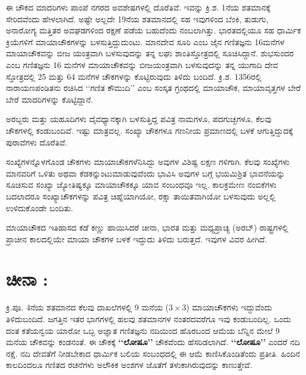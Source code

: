 ಈ ಚೌಕದ ಮಾದರಿಗಳು ಪಾಂಪೆ ನಗರದ ಅವಶೇಷಗಳಲ್ಲಿ ದೊರೆತಿವೆ. ಇವನ್ನು ಕ್ರಿ.ಶ. 1ನೆಯ ಶತಮಾನಕ್ಕೆ ಸೇರಿದವೆಂದು ಹೇಳಲಾಗಿದೆ. ಅಷ್ಟೇ ಅಲ್ಲದೇ 19ನೆಯ ಶತಮಾನದಲ್ಲಿ ಸಹ ಇವುಗಳಿಂದ ಬೆಂಕಿ, ತುಡುಗು, ಅನಾರೋಗ್ಯ ಮತ್ತಿತರ ಅವಘಡಗಳಿಂದ ರಕ್ಷಣೆ ಪಡೆಯ ಬಹುದೆಂದು ನಂಬಲಾಗಿತ್ತು. ಭಾರತದಲ್ಲಿಯೂ ಸಹ ಧಾರ್ಮಿಕ ಕ್ರಿಯೆಗಳಿಗೆ ಮಾಯಾ\-ಚೌಕಗಳನ್ನು ಬಳಸುತ್ತಿದ್ದುದುಂಟು. ಮಾನದೇವ ಸೂರಿ ಎಂಬ ಜೈನ ಗಣಿತಜ್ಞನು 16ಮನೆಗಳ ಮಾಯಾ\-ಚೌಕವನ್ನು ಬೀಜ ಯಂತ್ರವಾಗಿ ಬಳಸುವುದನ್ನು ತನ್ನ ಲಘು ಶಾಂತಿಸ್ತೋತ್ರದಲ್ಲಿ ಸೂಚಿಸಿ\-ದ್ದಾನೆ. ಶುಭಸುಂದರ ಎಂಬ ಗಣಿತಜ್ಞನು 16 ಮನೆಗಳ ಮಾಯಾಚೌಕವನ್ನು ಬೀಜಯಂತ್ರವಾಗಿ ಬಳಸುವುದನ್ನು ತನ್ನ ಯುಗಾದಿ ದೇವ ಸ್ತೋತ್ರದಲ್ಲಿ 25 ಮತ್ತು 64 ಮನೆಗಳ ಚೌಕಗಳನ್ನು ಕೊಟ್ಟಿರುವುದು ತಿಳಿದು ಬಂದಿದೆ. ಕ್ರಿ.ಶ. 1356ರಲ್ಲಿ ನಾರಾಯಣಪಂಡಿತನು ರಚಿಸಿದ ‘‘ಗಣಿತ ಕೌಮುದಿ’’ ಎಂಬ ಸಂಸ್ಕತ ಗ್ರಂಥದಲ್ಲಿ ಮಾಯಾಚೌಕ, ಮಾಯಾವೃತ್ತಗಳ ಬೇರೆ ಬೇರೆ ಮಾದರಿಗಳನ್ನು ಕೊಟ್ಟಿದ್ದಾನೆ.

ಅರಬ್ಬರು ಮತ್ತು ಯಹೂದಿಗಳು ದೈವಧ್ಯಾನಕ್ಕಾಗಿ ಬಳಸುತ್ತಿದ್ದ ಪವಿತ್ರ ನಾಮಗಳೂ, ಪದಗುಚ್ಛಗಳೂ, ಕೆಲವು ಚೌಕಗಳಲ್ಲಿ ಕಂಡುಬಂದಿವೆ. ಇಷ್ಟು ಮಾತ್ರವಲ್ಲ. ಸಂಖ್ಯಾ ಚೌಕಗಳೂ ಗಣನೀಯ ಪ್ರಮಾಣದಲ್ಲಿ ಬಳಕೆ ಆಗುತ್ತಿದ್ದುದಕ್ಕೆ ಪುರಾವೆಗಳು ದೊರೆತಿವೆ.

ಸಂಖ್ಯೆಗಳನ್ನೊಳಗೊಂಡ ಚೌಕಗಳು ಮಾಯಾಚೌಕಗಳೆನಿಸಿದ್ದು ಅವುಗಳ ವಿಶಿಷ್ಟ ಲಕ್ಷಣ ಗಳಿಗಾಗಿ. ಕೆಲವು ಸಂಖ್ಯೆಗಳು ಮಾನವರಿಗೆ ಒಳಿತು ಅಥವಾ ಕೆಡಕನ್ನುಂಟುಮಾಡುವುವೆಂದು ಭಾವಿಸಿ ಅವುಗಳ ಬಗ್ಗೆ ಭಯಮಿಶ್ರಿತ ಭಾವನೆಯನ್ನು ಸೂಚಿಸುವ ಸಂಖ್ಯಾ ಜ್ಯೋತಿಷ್ಯಕ್ಕೂ ಮಾಯಾಚೌಕಕ್ಕೂ ಯಾವ ಸಂಬಂಧವೂ ಇಲ್ಲ. ಕಾಲಕ್ರಮೇಣ ನಂಬಿಕೆಗಳು ಬದಲಾದರೂ ಸಂಖ್ಯಾ\-ಚೌಕಗಳನ್ನು ಪವಿತ್ರ ಚಿಹ್ನೆಯಾಗಿಯೋ, ರಕ್ಷಾ ತಾಯಿತವಾಗಿಯೋ ಬಳಸುವುದು ಅಲ್ಲಲ್ಲಿ ಉಳಿದುಕೊಂಡೇ ಬಂದಿತು.

ಮಾಯಾಚೌಕದ ಇತಿಹಾಸದ ಕಡೆ ಕಣ್ಣು ಹಾಯಿಸಿದರೆ ಚೀನಾ, ಭಾರತ ಮತ್ತು ಮಧ್ಯಪ್ರಾಚ್ಯ (ಅರಬ್) ರಾಷ್ಟ್ರಗಳಲ್ಲಿ ಪ್ರಾಚೀನ ಕಾಲದಲ್ಲಿಯೇ ಮಾಯಾ ಚೌಕಗಳ ಬಳಕೆ ಇದ್ದುದು ತಿಳಿದು ಬರುತ್ತದೆ. ಇವುಗಳ ವಿವರ ಹೀಗಿದೆ.

\section*{ಚೀನಾ :}

ಕ್ರಿ.ಪೂ. 4ನೆಯ ಶತಮಾನದ ಕೆಲವು ದಾಖಲೆಗಳಲ್ಲಿ 9 ಮನೆಯ ($3 \times 3$) ಮಾಯಾಚೌಕಗಳು ಇದ್ದುವೆಂದು ತಿಳಿದುಬಂದಿದೆ. ಜಗತ್ತಿನ ಇತರ ಭಾಗಗಳಲ್ಲಿ ಹಲವು ಶತಮಾನಗಳ ನಂತರದ\-ವರೆಗೂ ಇವು ಕಂಡುಬಂದಿಲ್ಲ. ಒಂದು ದಂತ ಕತೆಯನ್ವಯ ಯಾರೋ ಒಬ್ಬ ಅಜ್ಞಾತ ಗಣಿತಜ್ಞನು ನದಿಯಿಂದ ಹೊರಬಂದ ಆಮೆಯ ಬೆನ್ನಿನ ಮೇಲೆ 9 ಮನೆಯ ಚೌಕವನ್ನು ಕಂಡನಂತೆ. ಈ ಚೌಕಕ್ಕೆ \textbf{‘‘ಲೋಷೂ’’} ಚೌಕವೆಂದು ಹೆಸರಿಡಲಾಗಿದೆ. \textbf{‘‘ಲೋಷೂ’’} ಎಂದರೆ ನದಿ ನಕ್ಷೆ. ನದಿ ದೇವತೆಗೆ ನೀಡಬೇಕಾದ ಧಾರ್ಮಿಕ ಬಲಿಯ ಸಂಬಂಧದಲ್ಲಿ ಈ ಆಮೆ ಕಾಣಿಸಿಕೊಂಡಿತೆಂದು ಪ್ರತೀತಿ. ಹಿಂದಿನ ಕಾಲದಿಂದಲೂ ಗಣಿತದ ರಚನೆಗಳು ಅಲೌಕಿಕ ಅಂಶಗಳ ಜೊತೆಗೆ ತಳುಕಾಗಿರುವುದನ್ನು ಕಾಣುತ್ತೇವೆ.

